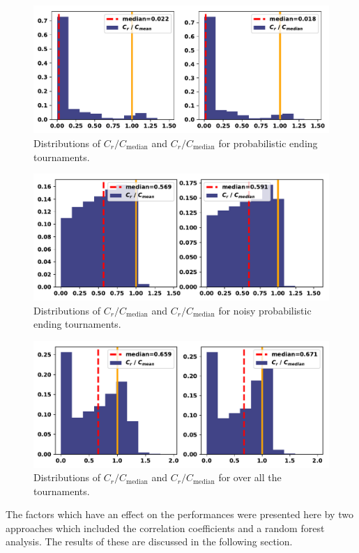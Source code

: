 \documentclass{article}
\begin{document}
\begin{figure}[!htbp]
    \centering
    \includegraphics[width=.7\textwidth]{../images/compared_to_mean_median_probend.pdf}
    \caption{Distributions of \(C_r / C_{\text{median}}\)
    and \(C_r / C_{\text{median}}\) for probabilistic ending tournaments.}\label{fig:mean_median_probend}
\end{figure}

\begin{figure}[!htbp]
    \centering
    \includegraphics[width=.7\textwidth]{../images/compared_to_mean_median_probend_noisy.pdf}
    \caption{Distributions of \(C_r / C_{\text{median}}\)
    and \(C_r / C_{\text{median}}\) for noisy probabilistic ending tournaments.}\label{fig:mean_median_probend_noisy}
\end{figure}

\begin{figure}[!htbp]
    \centering
    \includegraphics[width=.7\textwidth]{../images/compared_to_mean_median_overall.pdf}
    \caption{Distributions of \(C_r / C_{\text{median}}\)
    and \(C_r / C_{\text{median}}\) for over all the tournaments.}\label{fig:mean_median_overall}
\end{figure}

The factors which have an effect on the performances were presented here by two
approaches which included the correlation coefficients and a random forest
analysis. The results of these are discussed in the following section.
\end{document}
